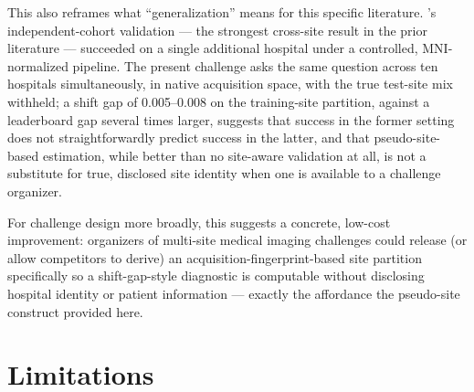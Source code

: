 \documentclass[10pt]{article}
\begin{document}
This also reframes what ``generalization'' means for this specific literature. \citet{choi2017}'s independent-cohort validation --- the strongest cross-site result in the prior literature --- succeeded on a single additional hospital under a controlled, MNI-normalized pipeline. The present challenge asks the same question across ten hospitals simultaneously, in native acquisition space, with the true test-site mix withheld; a shift gap of 0.005--0.008 on the training-site partition, against a leaderboard gap several times larger, suggests that success in the former setting does not straightforwardly predict success in the latter, and that pseudo-site-based estimation, while better than no site-aware validation at all, is not a substitute for true, disclosed site identity when one is available to a challenge organizer.

For challenge design more broadly, this suggests a concrete, low-cost improvement: organizers of multi-site medical imaging challenges could release (or allow competitors to derive) an acquisition-fingerprint-based site partition specifically so a shift-gap-style diagnostic is computable without disclosing hospital identity or patient information --- exactly the affordance the pseudo-site construct provided here.

\section{Limitations}
\label{sec:limitations}
\end{document}
